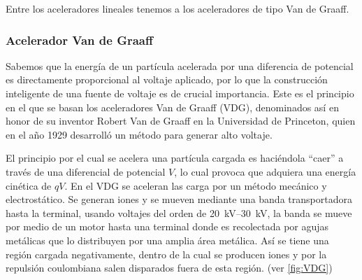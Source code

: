 \documentclass[12pt]{article}
\theoremstyle{break}
\theoremstyle{nonumberbreak}
\begin{document}
    Entre los aceleradores lineales tenemos a los aceleradores de tipo Van de Graaff.

    \subsubsection{Acelerador Van de Graaff}

    Sabemos que la energía de un partícula acelerada por una diferencia de potencial es directamente proporcional al voltaje aplicado, por lo que la construcción inteligente de una fuente de voltaje es de crucial importancia. Este es el principio en el que se basan los aceleradores Van de Graaff (VDG), denominados así en honor de su inventor Robert Van de Graaff en la Universidad de Princeton, quien en el año 1929 desarrolló un método para generar alto voltaje.\cite{das2003introduction}
    
    El principio por el cual se acelera una partícula cargada es haciéndola ``caer'' a través de una diferencial de potencial \(V\), lo cual provoca que adquiera una energía cinética de \(qV\). En el VDG se aceleran las carga por un método mecánico y electrostático. Se generan iones y se mueven mediante una banda transportadora hasta la terminal, usando voltajes del orden de \qtyrange{20}{30}{\kV}, la banda se mueve por medio de un motor hasta una terminal donde es recolectada por agujas metálicas que lo distribuyen por una amplia área metálica. Así se tiene una región cargada negativamente, dentro de la cual se producen iones y por la repulsión coulombiana salen disparados fuera de esta región.\cite{krane1991introductory} (ver \cref{fig:VDG})
    
\end{document}

